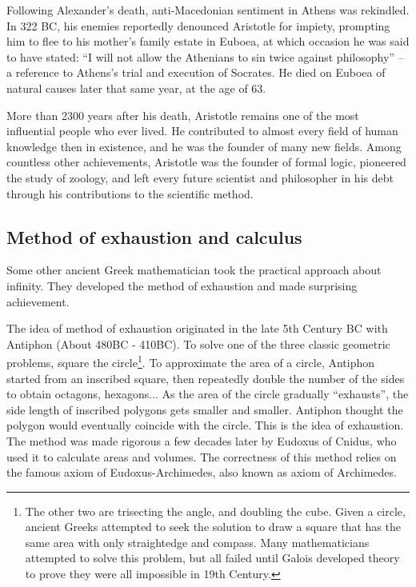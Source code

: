 \documentclass{article}
\begin{document}
Following Alexander's death, anti-Macedonian sentiment in Athens was rekindled. In 322 BC, his enemies reportedly denounced Aristotle for impiety, prompting him to flee to his mother's family estate in Euboea, at which occasion he was said to have stated: ``I will not allow the Athenians to sin twice against philosophy'' – a reference to Athens's trial and execution of Socrates. He died on Euboea of natural causes later that same year, at the age of 63.

More than 2300 years after his death, Aristotle remains one of the most influential people who ever lived. He contributed to almost every field of human knowledge then in existence, and he was the founder of many new fields. Among countless other achievements, Aristotle was the founder of formal logic, pioneered the study of zoology, and left every future scientist and philosopher in his debt through his contributions to the scientific method.

\subsection{Method of exhaustion and calculus}

Some other ancient Greek mathematician took the practical approach about infinity. They developed the method of exhaustion and made surprising achievement.

The idea of method of exhaustion originated in the late 5th Century BC with Antiphon (About 480BC - 410BC). To solve one of the three classic geometric problems, square the circle\footnote{The other two are trisecting the angle, and doubling the cube. Given a circle, ancient Greeks attempted to seek the solution to draw a square that has the same area with only straightedge and compass. Many mathematicians attempted to solve this problem, but all failed until Galois developed theory to prove they were all impossible in 19th Century.}. To approximate the area of a circle, Antiphon started from an inscribed square, then repeatedly double the number of the sides to obtain octagons, hexagons... As the area of the circle gradually ``exhausts'', the side length of inscribed polygons gets smaller and smaller. Antiphon thought the polygon would eventually coincide with the circle. This is the idea of exhaustion. The method was made rigorous a few decades later by Eudoxus of Cnidus, who used it to calculate areas and volumes. The correctness of this method relies on the famous axiom of Eudoxus-Archimedes, also known as axiom of Archimedes.
\end{document}

